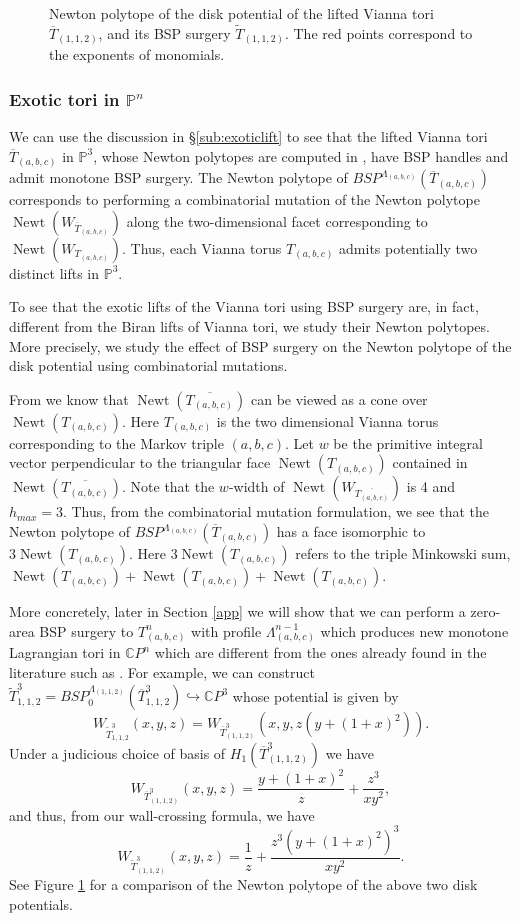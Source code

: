 \documentclass[11pt, oneside,dvipsnames]{amsart}
\newcommand{\incfig}[2]{
   
        \def\svgscale{#1}
    {#2.pdf_tex}
      
      
  
 }
\newcommand{\wt}{\widetilde}
\newcommand{\<}{\langle}
\renewcommand{\>}{\rangle}
\newcommand{\bC}{\mathbb{C}}
\newcommand{\bP}{\mathbb{P}}
\DeclareMathOperator{\newt}{Newt}
\newcommand{\abc}{{(a,b,c)}}
\theoremstyle{definition}
\theoremstyle{definition}
\numberwithin{equation}{subsection}
\begin{document}
\begin{figure}[ht]
    \makebox[\textwidth][c]{\incfig{1}{newtpoly112}}
    \caption{Newton polytope of the disk potential of the lifted Vianna tori $\overline{T}_{(1,1,2)}$, and its BSP surgery $\wt {T}_{(1,1,2)} $. The red points correspond to the exponents of monomials.}
    \label{fig:newts}
\end{figure}


\subsubsection{Exotic tori in $\bP^n$}
We can use the  discussion in \S \ref{sub:exoticlift} to see that the lifted Vianna tori $\overline{T}_\abc$ in $\bP^3$, whose Newton polytopes are computed in \cite{chw}, have BSP handles and admit monotone BSP surgery. The Newton polytope of $BSP^{\Lambda_\abc}(\overline{T}_\abc)$ corresponds to performing a combinatorial mutation of the Newton polytope $\newt(W_{\overline{T}_\abc})$ along the two-dimensional facet corresponding to $\newt(W_{T_\abc})$. Thus, each Vianna torus $T_\abc$ admits potentially two distinct lifts in $\bP^3$. 

To see that the exotic lifts of the Vianna tori using BSP surgery are, in fact, different from the Biran lifts of Vianna tori, we study their Newton polytopes. More precisely, we study the effect of BSP surgery on the Newton polytope of the disk potential using combinatorial mutations. 

From \cite{chw} we know that $\newt(\overline{T_\abc})$ can be viewed as a cone over $\newt(T_\abc)$. Here $T_\abc$ is the two dimensional Vianna torus corresponding to the Markov triple $\abc$. Let $w$ be the primitive integral vector perpendicular to the triangular face $\newt(T_\abc)$ contained in $\newt(\overline{T_\abc})$. Note that the $w$-width of $\newt (W_{\overline{T_\abc}})$ is 4 and $h_{max} = 3$. Thus, from the combinatorial mutation formulation, we see that the Newton polytope of $BSP^{\Lambda_\abc}(\overline{T}_\abc)$ has a face isomorphic to $3\newt(T_\abc)$. Here $3\newt(T_\abc)$ refers to the triple Minkowski sum, $\newt(T_\abc) + \newt(T_\abc) + \newt(T_\abc)$.



More concretely, later in Section \ref{app} we will show that we can perform a zero-area BSP surgery to $T^n_\abc$ with profile $\Lambda^{n-1}_{\abc}$ which produces new monotone Lagrangian tori in $\bC P^n$ which are different from the ones already found in the literature such as \cite{PT20,chw,Y22}. For example, we can construct $ \wt T^3_{1,1,2} =BSP^{\Lambda_{(1,1,2)}}_0(\overline{T}^3_{1,1,2}) \hookrightarrow \bC P^3$ whose potential is given by $$W_{\wt T^3_{1,1,2}}(x,y,z)=W_{\overline{T}^3_{(1,1,2)}} (x,y,z(y+(1+x)^2)).$$ Under a judicious choice of basis of $H_1(\overline{T}^3_{(1,1,2)})$ we have 
$$W_{\overline{T}^3_{(1,1,2)}}(x,y,z) = \frac{y+(1+x)^2}{z} + \frac{z^3}{xy^2},$$
and thus, from our wall-crossing formula, we have 
$$W_{\wt T^3_{(1,1,2)}}(x,y,z) = \frac{1}{z} + \frac{z^3(y+(1+x)^2)^3}{xy^2}.$$
See Figure \ref{fig:newts} for a comparison of the Newton polytope of the above two disk potentials. 
\end{document}
